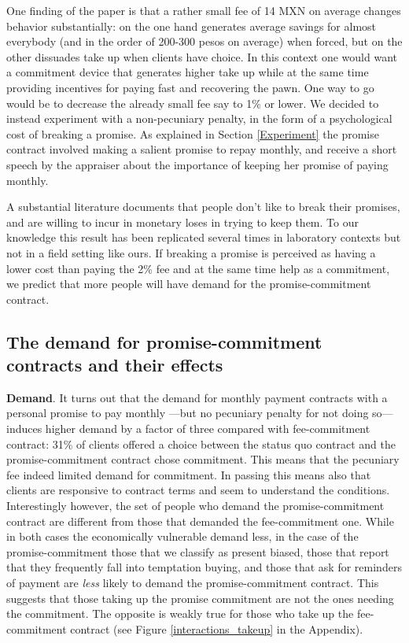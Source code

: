 \documentclass[oneside,11pt]{article}
\begin{document}
One finding of the paper is that a rather small fee of 14 MXN on average changes behavior substantially: on the one hand generates average savings for almost everybody (and in the order of 200-300 pesos on average) when forced, but on the other dissuades take up when clients have choice. In this context one would want a commitment device that generates higher take up while at the same time providing incentives for paying fast and recovering the pawn. One way to go would be to decrease the already small fee say to 1\% or lower. We decided to instead experiment with a non-pecuniary penalty, in the form of a psychological cost of breaking a promise. As explained in Section \ref{Experiment} the promise contract involved making a salient promise to repay monthly, and receive a short speech by the appraiser about the importance of keeping her promise of paying monthly.

A substantial literature documents that people don't like to break their promises, and are willing to incur in monetary loses in trying to keep them. To our knowledge this result has been replicated several times in laboratory contexts but not in a field setting like ours. If breaking a promise is perceived as having a lower cost than paying the 2\% fee and at the same time help as a commitment, we predict that more people will have demand for the promise-commitment contract.

\subsection{The demand for promise-commitment contracts and their effects}

\vspace{.1in}
\noindent \textbf{Demand}. It turns out that the demand for monthly payment contracts with a personal promise to pay monthly ---but no pecuniary penalty for not doing so--- induces higher demand by a factor of three compared with fee-commitment contract: 31\% of clients offered a choice between the status quo contract and the promise-commitment contract chose commitment. This means that the pecuniary fee indeed limited demand for commitment. In passing this means also that clients are responsive to contract terms and seem to understand the conditions. Interestingly however, the set of people who demand the promise-commitment contract are different from those that demanded the fee-commitment one. While in both cases the economically vulnerable demand less, in the case of the promise-commitment those that we classify as present biased, those that report that they frequently fall into temptation buying, and those that ask for reminders of payment are \textit{less} likely to demand the promise-commitment contract.  This suggests that those taking up the promise commitment are not the ones needing the commitment. The opposite is weakly true for those who take up the fee-commitment contract (see Figure \ref{interactions_takeup} in the Appendix). 
\end{document}
